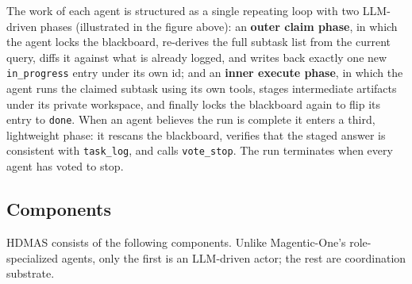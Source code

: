 \documentclass[11pt]{article}
\newcommand{\code}[1]{\texttt{#1}}
\begin{document}
The work of each agent is structured as a single repeating loop with two LLM-driven phases (illustrated in the figure above): an \textbf{outer claim phase}, in which the agent locks the blackboard, re-derives the full subtask list from the current query, diffs it against what is already logged, and writes back exactly one new \code{in\_progress} entry under its own id; and an \textbf{inner execute phase}, in which the agent runs the claimed subtask using its own tools, stages intermediate artifacts under its private workspace, and finally locks the blackboard again to flip its entry to \code{done}. When an agent believes the run is complete it enters a third, lightweight phase: it rescans the blackboard, verifies that the staged answer is consistent with \code{task\_log}, and calls \code{vote\_stop}. The run terminates when every agent has voted to stop.

\subsection{Components}

HDMAS consists of the following components. Unlike Magentic-One's role-specialized agents, only the first is an LLM-driven actor; the rest are coordination substrate.
\end{document}
